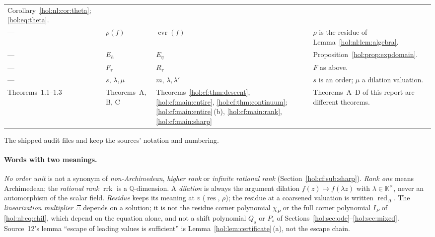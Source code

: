 \documentclass[11pt]{article}
\numberwithin{equation}{section}
\theoremstyle{definition}
\theoremstyle{remark}
\newcommand{\Q}{\mathbb Q}
\newcommand{\res}{\operatorname{res}}
\newcommand{\KK}{\mathbb K}
\newcommand{\rrk}{\operatorname{rrk}}
\newcommand{\cvr}{\operatorname{cvr}}
\newcommand{\red}{\operatorname{red}}
\begin{document}
\begin{center}
\begin{tabularx}{\textwidth}{@{}>{\raggedright\arraybackslash}p{}
>{\raggedright\arraybackslash}p{}
>{\raggedright\arraybackslash}p{}X@{}}
Corollary~\ref{hol:nl:cor:theta}; \eqref{hol:eq:theta}.\\
--- & $\rho(f)$ & $\cvr(f)$ & $\rho$ is the residue of
Lemma~\ref{hol:nl:lem:algebra}.\\
--- & $E_h$ & $E_\eta$ & Proposition~\ref{hol:prop:expdomain}.\\
--- & $F_\tau$ & $R_\tau$ & $F$ as above.\\
--- & $s$, $\lambda,\mu$ & $m$, $\lambda,\lambda'$ & $s$ is an order; $\mu$
a dilation valuation.\\
Theorems~1.1--1.3 & Theorems~A, B, C & Theorems~\ref{hol:cf:thm:descent},
\ref{hol:cf:main:entire}, \ref{hol:cf:thm:continuum};
\ref{hol:cf:main:entire}\,(b), \ref{hol:cf:main:rank},
\ref{hol:cf:main:sharp} & Theorems~A--D of this report are different
theorems.\\
\bottomrule
\end{tabularx}
\end{center}
The shipped audit files  and
 keep the sources'
notation and numbering.

\paragraph{Words with two meanings.}
\emph{No order unit} is not a synonym of \emph{non-Archimedean},
\emph{higher rank} or \emph{infinite rational rank}
(Section~\ref{hol:cf:sub:sharp}). \emph{Rank one} means Archimedean; the
\emph{rational rank} $\rrk$ is a $\Q$-dimension. A \emph{dilation} is always
the argument dilation $f(z)\mapsto f(\lambda z)$ with $\lambda\in\KK^\times$,
never an automorphism of the scalar field. \emph{Residue} keeps its meaning
at $v$ ($\res$, $\rho$); the residue at a coarsened valuation is written
$\red_\Delta$. The \emph{linearization multiplier} $\Xi$ depends on a
solution; it is not the residue corner polynomial $\chi_P$ or the full corner
polynomial $I_P$ of \eqref{hol:nl:eq:chiI}, which depend on the equation
alone, and not a shift polynomial $Q_s$ or $P_s$ of
Sections~\ref{hol:sec:ode}--\ref{hol:sec:mixed}. Source~12's lemma ``escape of
leading values is sufficient'' is Lemma~\ref{hol:lem:certificate}\,(a), not the
escape chain.
\end{document}
